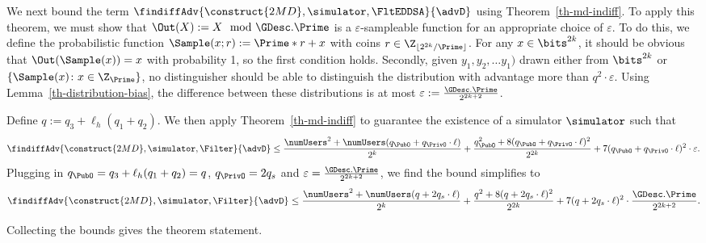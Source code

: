 We next bound the term $\findiffAdv{\construct{2MD},\simulator,\FltEDDSA}{\advD}$ using Theorem~\ref{th-md-indiff}. To apply this theorem, we must show that $\Out(X):= X \mod \GDesc.\Prime$ is a $\varepsilon$-sampleable function for an appropriate choice of $\varepsilon$. To do this, we define the probabilistic function $\Sample(x; r) := \Prime*r + x$ with coins $r \in \Z_{\lfloor 2^{2k}/\Prime\rfloor}$. For any $x\in \bits^{2k}$, it should be obvious that $\Out(\Sample(x)) = x$ with probability 1, so the first condition holds. Secondly, given $y_1, y_2, \ldots y_1)$ drawn either from $\bits^{2k}$ or $\{\Sample(x) \colon x \in \Z_\Prime\}$, no distinguisher should be able to distinguish the distribution with advantage more than $q^2 \cdot \varepsilon$. Using Lemma~\ref{th-distribution-bias}, the difference between these distributions is at most $\varepsilon := \frac{\GDesc.\Prime}{2^{2k+2}}$.

Define $q:= q_3 + \ell_h(q_1 + q_2)$.
We then apply Theorem~\ref{th-md-indiff} to guarantee the existence of a simulator $\simulator$ such that 
	\[\findiffAdv{\construct{2MD},\simulator,\Filter}{\advD} \leq \frac{\numUsers^2 + \numUsers(q_{\PubO} +q_{\PrivO} \cdot \ell)}{2^k}+ \frac{q_{\PubO}^2+8(q_{\PubO}+q_{\PrivO} \cdot \ell)^2}{2^{2k}} + 7(q_{\PubO}+q_{\PrivO} \cdot \ell)^2\cdot \varepsilon.\]
		Plugging in $q_{\PubO} = q_3 + \ell_h(q_1+q_2) = q$, $q_{\PrivO} = 2 q_s$ and $\varepsilon = \frac{\GDesc.\Prime}{2^{2k+2}}$, we find the bound simplifies to 
	\[\findiffAdv{\construct{2MD},\simulator,\Filter}{\advD} \leq \frac{\numUsers^2 + \numUsers(q +2q_s \cdot \ell)}{2^k}+ \frac{q^2+8(q+2q_s \cdot \ell)^2}{2^{2k}} + 7(q+2q_s \cdot \ell)^2\cdot \frac{\GDesc.\Prime}{2^{2k+2}}.\]
	
Collecting the bounds gives the theorem statement. 

